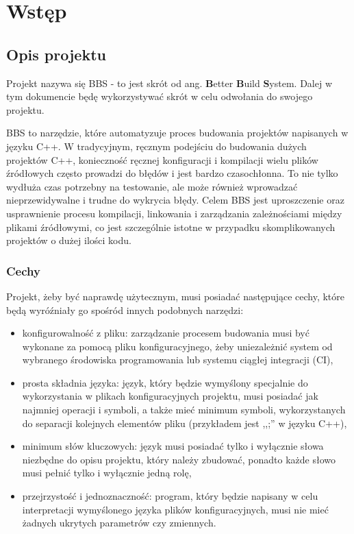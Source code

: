 \chapter{Wstęp}
\section{Opis projektu}

Projekt nazywa się BBS - to jest skrót od ang. \textbf{B}etter \textbf{B}uild \textbf{S}ystem. Dalej w tym dokumencie będę wykorzystywać skrót w celu odwołania do swojego projektu.

BBS to narzędzie, które automatyzuje proces budowania projektów napisanych w języku C++. W tradycyjnym, ręcznym podejściu do budowania dużych projektów C++, konieczność ręcznej konfiguracji i kompilacji wielu plików źródłowych często prowadzi do błędów i jest bardzo czasochłonna. To nie tylko wydłuża czas potrzebny na testowanie, ale może również wprowadzać nieprzewidywalne i trudne do wykrycia błędy. Celem BBS jest uproszczenie oraz usprawnienie procesu kompilacji, linkowania i zarządzania zależnościami między plikami źródłowymi, co jest szczególnie istotne w przypadku skomplikowanych projektów o dużej ilości kodu.

\subsection{Cechy}
Projekt, żeby być naprawdę użytecznym, musi posiadać następujące cechy, które będą wyróźniały go spośród innych podobnych narzędzi:

\begin{itemize}
    \item konfigurowalność z pliku: zarządzanie procesem budowania musi być wykonane za pomocą pliku konfiguracyjnego, żeby uniezależnić system od wybranego środowiska programowania lub systemu ciągłej integracji (CI),
    \item prosta składnia języka: język, który będzie wymyślony specjalnie do wykorzystania w plikach konfiguracyjnych projektu, musi posiadać jak najmniej operacji i symboli, a także mieć minimum symboli, wykorzystanych do separacji kolejnych elementów pliku (przykładem jest ,,;'' w języku C++),
    \item minimum słów kluczowych: język musi posiadać tylko i wyłącznie słowa niezbędne do opisu projektu, który należy zbudować, ponadto każde słowo musi pełnić tylko i wyłącznie jedną rolę,
    \item przejrzystość i jednoznaczność: program, który będzie napisany w celu interpretacji wymyślonego języka plików konfiguracyjnych, musi nie mieć żadnych ukrytych parametrów czy zmiennych.
\end{itemize}

